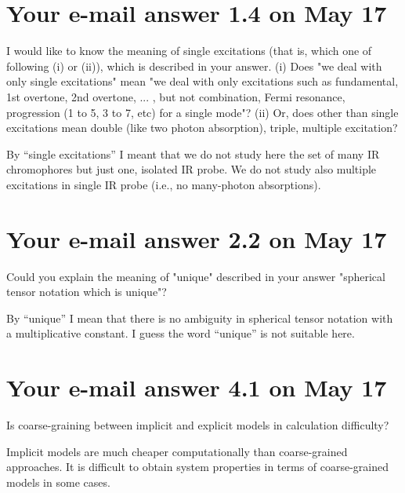 \documentclass{exam}
\begin{document}
\section{Your e-mail answer 1.4 on May 17}
\begin{questions}

%
\question I would like to know the meaning of single excitations (that is, which one of following (i) or (ii)), which is described in your answer. (i) Does "we deal with only single excitations" mean "we deal with only excitations such as fundamental, 1st overtone, 2nd overtone, ... , but not combination, Fermi resonance, progression (1 to 5, 3 to 7, etc) for a single mode"? (ii) Or, does other than single excitations mean double (like two photon absorption), triple, multiple excitation?

\begin{solution}
By ``single excitations'' I meant that we do not study here the set of many IR chromophores but just one, isolated
IR probe. We do not study also multiple excitations in single IR probe (i.e., no many-photon absorptions).
\end{solution}
\end{questions}


\section{Your e-mail answer 2.2 on May 17}
\begin{questions}

%
\question Could you explain the meaning of "unique" described in your answer "spherical tensor notation which is unique"?

\begin{solution}
By ``unique'' I mean that there is no ambiguity in spherical tensor notation with a multiplicative constant. I guess the word
``unique'' is not suitable here.
\end{solution}

\end{questions}

\section{Your e-mail answer 4.1 on May 17}
\begin{questions}

%
\question Is coarse-graining between implicit and explicit models in calculation difficulty?

\begin{solution}
Implicit models are much cheaper computationally than coarse-grained approaches. It is difficult
to obtain system properties in terms of coarse-grained models in some cases.
\end{solution}

\end{questions}
\end{document}
